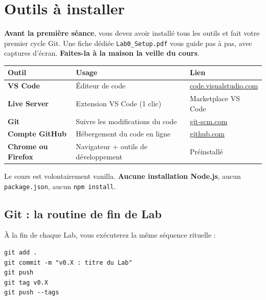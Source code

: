 \documentclass[11pt,a4paper]{article}
\begin{document}
\newpage

\section{Outils à installer}

\textbf{Avant la première séance}, vous devez avoir installé tous les
outils et fait votre premier cycle Git. Une fiche dédiée \texttt{Lab0\_Setup.pdf}
vous guide pas à pas, avec captures d'écran. \textbf{Faites-la à la maison
la veille du cours}.

\begin{center}
\begin{tabular}{lll}
\toprule
\textbf{Outil} & \textbf{Usage} & \textbf{Lien} \\
\midrule
\textbf{VS Code} & Éditeur de code & \href{https://code.visualstudio.com}{code.visualstudio.com} \\
\textbf{Live Server} & Extension VS Code (1 clic) & Marketplace VS Code \\
\textbf{Git} & Suivre les modifications du code & \href{https://git-scm.com}{git-scm.com} \\
\textbf{Compte GitHub} & Hébergement du code en ligne & \href{https://github.com}{github.com} \\
\textbf{Chrome ou Firefox} & Navigateur + outils de développement & Préinstallé \\
\bottomrule
\end{tabular}
\end{center}

\begin{attentionbox}
Le cours est volontairement vanilla. \textbf{Aucune installation Node.js},
aucun \texttt{package.json}, aucun \texttt{npm install}.
\end{attentionbox}

\subsection{Git : la routine de fin de Lab}

À la fin de chaque Lab, vous exécuterez la même séquence rituelle :

\begin{lstlisting}
git add .
git commit -m "v0.X : titre du Lab"
git push
git tag v0.X
git push --tags
\end{lstlisting}
\end{document}
